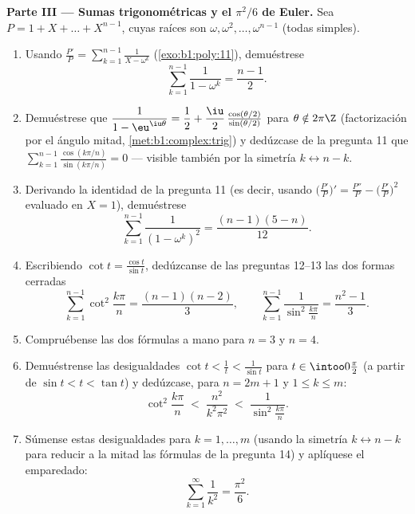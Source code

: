 \begin{problem}
\medskip
\noindent\textbf{Parte III --- Sumas trigonométricas y el $\pi^2/6$ de
Euler.} Sea $P = 1 + X + \dots + X^{n-1}$, cuyas raíces son
$\omega, \omega^2, \dots, \omega^{n-1}$ (todas simples).
\begin{enumerate}[resume]
  \item Usando $\frac{P'}P = \sum_{k=1}^{n-1}\frac1{X - \omega^k}$
        (\cref{exo:b1:poly:11}), demuéstrese
        \[
        \sum_{k=1}^{n-1}\frac{1}{1 - \omega^k} = \frac{n-1}2 .
        \]
  \item Demuéstrese que $\dfrac1{1 - \eu^{\iu\theta}} = \dfrac12 +
        \dfrac\iu2\,\frac{\cos(\theta/2)}{\sin(\theta/2)}$ para
        $\theta \notin 2\pi\Z$ (factorización por el ángulo mitad,
        \cref{met:b1:complex:trig}) y dedúzcase de la pregunta 11 que
        $\sum_{k=1}^{n-1} \frac{\cos(k\pi/n)}{\sin(k\pi/n)} = 0$ ---
        visible también por la simetría $k \leftrightarrow n - k$.
  \item Derivando la identidad de la pregunta 11 (es decir, usando
        $\bigl(\frac{P'}P\bigr)' = \frac{P''}P -
        \bigl(\frac{P'}P\bigr)^2$ evaluado en $X = 1$), demuéstrese
        \[
        \sum_{k=1}^{n-1}\frac{1}{(1 - \omega^k)^2}
        = \frac{(n-1)(5-n)}{12} .
        \]
  \item Escribiendo $\cot t = \frac{\cos t}{\sin t}$, dedúzcanse de
        las preguntas 12--13 las dos formas cerradas
        \[
        \sum_{k=1}^{n-1}\cot^2\frac{k\pi}n = \frac{(n-1)(n-2)}3,
        \qquad
        \sum_{k=1}^{n-1}\frac1{\sin^2\frac{k\pi}n}
        = \frac{n^2-1}3 .
        \]
  \item Compruébense las dos fórmulas a mano para $n = 3$ y $n = 4$.
  \item Demuéstrense las desigualdades $\cot t < \frac1t <
        \frac1{\sin t}$ para $t \in \intoo0{\frac\pi2}$ (a partir de
        $\sin t < t < \tan t$) y dedúzcase, para $n = 2m + 1$ y
        $1 \leq k \leq m$:
        \[
        \cot^2\frac{k\pi}n \;<\; \frac{n^2}{k^2\pi^2}
        \;<\; \frac1{\sin^2\frac{k\pi}n} .
        \]
  \item Súmense estas desigualdades para $k = 1, \dots, m$ (usando la
        simetría $k \leftrightarrow n - k$ para reducir a la mitad las
        fórmulas de la pregunta 14) y aplíquese el emparedado:
        \[
        \sum_{k=1}^{\infty}\frac1{k^2} = \frac{\pi^2}6 .
        \]
\end{enumerate}


\end{problem}

